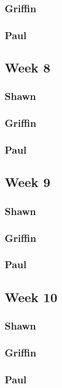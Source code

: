\documentclass[10pt,draftclsnofoot,onecolumn]{IEEEtran}
\begin{document}
\subsubsection{Griffin}
\subsubsection{Paul}

\subsection{Week 8}
\subsubsection{Shawn}
\subsubsection{Griffin}
\subsubsection{Paul}

\subsection{Week 9}
\subsubsection{Shawn}
\subsubsection{Griffin}
\subsubsection{Paul}

\subsection{Week 10}
\subsubsection{Shawn}
\subsubsection{Griffin}
\subsubsection{Paul}
\end{document}
